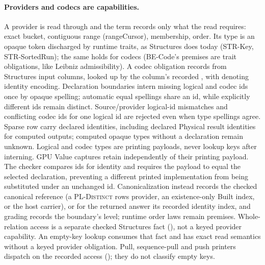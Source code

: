 \paragraph{Providers and codecs are capabilities.} A provider is read
through  and the term records only what the read requires:
exact bucket, contiguous range (rangeCursor), membership, order. Its type
is an opaque token discharged by runtime traits, as Structures does today
(STR-Key, STR-SortedRun); the same holds for codecs (BE-Code's premises
are trait obligations, like Leibniz admissibility). A codec obligation
records  from Structures input columns,
looked up by the column's recorded , with 
denoting identity encoding. Declaration boundaries intern missing logical
and codec ids once by opaque spelling; automatic equal spellings share an id,
while explicitly different ids remain distinct. Source/provider logical-id
mismatches and conflicting codec ids for one logical id are rejected even
when type spellings agree. Sparse row  carry declared
identities, including declared Physical result identities for computed outputs;
computed opaque types without a declaration remain unknown. Logical and codec
types are printing payloads, never lookup keys after interning.
GPU Value captures retain  independently of
their printing payload. The checker compares ids for identity and requires the
payload to equal the selected declaration, preventing a different printed
implementation from being substituted under an unchanged id.
Canonicalization instead
records the checked canonical reference (a \textsc{PL-Distinct} rows provider,
an existence-only Built index, or the host carrier), or for the returned
answer its recorded identity index, and grading records the boundary's level;
runtime order laws remain premises.
Whole-relation access is a separate checked Structures fact
(), not a keyed provider capability. An empty-key
lookup consumes that fact and has exact read semantics without a keyed
provider obligation. Pull, sequence-pull and push printers dispatch on the
recorded access (); they do not classify empty keys.

